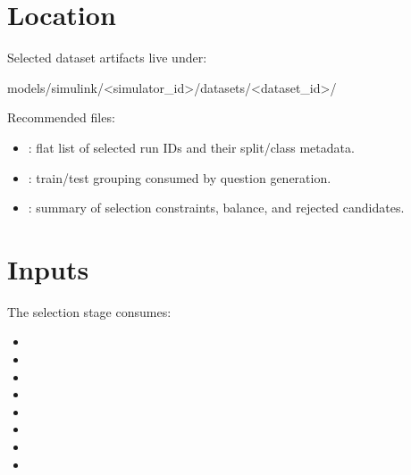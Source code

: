 \documentclass[11pt]{article}
\begin{document}
\section*{Location}

Selected dataset artifacts live under:

\begin{DocCode}
models/simulink/<simulator_id>/datasets/<dataset_id>/
\end{DocCode}

Recommended files:

\begin{itemize}
\item {}: flat list of selected run IDs and their split/class metadata.
\item {}: train/test grouping consumed by question generation.
\item {}: summary of selection constraints, balance, and rejected candidates.
\end{itemize}

\section*{Inputs}

The selection stage consumes:

\begin{itemize}
\item {}
\item {}
\item {}
\item {}
\item {}
\item {}
\item {}
\item {}
\end{itemize}

\section*{\texorpdfstring{}{selected\_runs.jsonl}}
\end{document}
